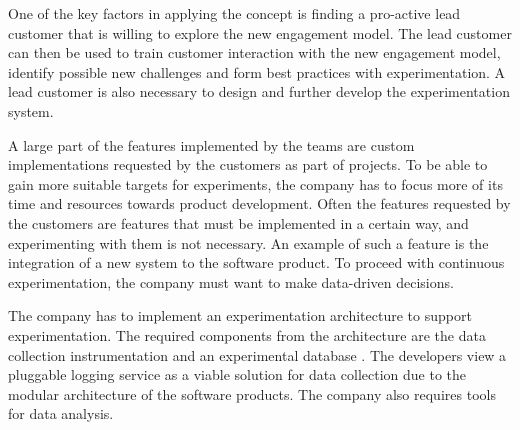 \documentclass[english]{tktltiki2}
\theoremstyle{definition}
\theoremstyle{remark}
\begin{document}


One of the key factors in applying the concept is finding a pro-active lead customer that is willing to explore the new engagement model. The lead customer can then be used to train customer interaction with the new engagement model, identify possible new challenges and form best practices with experimentation. A lead customer is also necessary to design and further develop the experimentation system.

A large part of the features implemented by the teams are custom implementations requested by the customers as part of projects. To be able to gain more suitable targets for experiments, the company has to focus more of its time and resources towards product development. Often the features requested by the customers are features that must be implemented in a certain way, and experimenting with them is not necessary. An example of such a feature is the integration of a new system to the software product. To proceed with continuous experimentation, the company must want to make data-driven decisions.

The company has to implement an experimentation architecture to support experimentation. The required components from the architecture are the data collection instrumentation and an experimental database \cite{kohavi2007practical, fagerholm2014building}. The developers view a pluggable logging service as a viable solution for data collection due to the modular architecture of the software products. The company also requires tools for data analysis.
\end{document}

